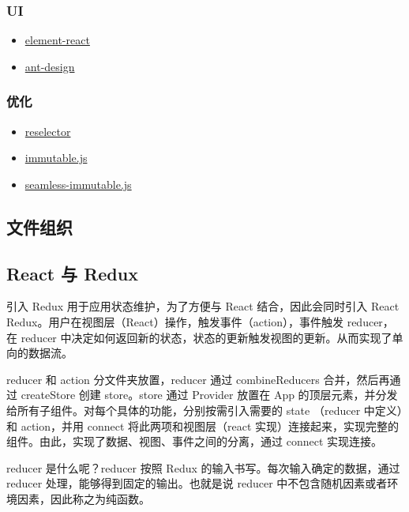 \subsubsection{UI}\label{ui}

\begin{itemize}
\tightlist
\item
  \href{https://eleme.github.io/element-react/}{element-react}
\item
  \href{https://ant.design/}{ant-design}
\end{itemize}

\subsubsection{优化}\label{ux4f18ux5316}

\begin{itemize}
\tightlist
\item
  \href{https://github.com/reactjs/reselect}{reselector}
\item
  \href{https://github.com/facebook/immutable-js}{immutable.js}
\item
  \href{https://github.com/rtfeldman/seamless-immutable}{seamless-immutable.js}
\end{itemize}

\subsection{文件组织}\label{ux6587ux4ef6ux7ec4ux7ec7}

\subsection{React 与 Redux}\label{react-ux4e0e-redux}

引入 Redux 用于应用状态维护，为了方便与 React 结合，因此会同时引入 React
Redux。用户在视图层（React）操作，触发事件（action），事件触发
reducer，在 reducer
中决定如何返回新的状态，状态的更新触发视图的更新。从而实现了单向的数据流。

reducer 和 action 分文件夹放置，reducer 通过 combineReducers
合并，然后再通过 createStore 创建 store。store 通过 Provider 放置在 App
的顶层元素，并分发给所有子组件。对每个具体的功能，分别按需引入需要的
state （reducer 中定义）和 action，并用 connect 将此两项和视图层（react
实现）连接起来，实现完整的组件。由此，实现了数据、视图、事件之间的分离，通过
connect 实现连接。

reducer 是什么呢？reducer 按照 Redux
的输入书写。每次输入确定的数据，通过 reducer
处理，能够得到固定的输出。也就是说 reducer
中不包含随机因素或者环境因素，因此称之为纯函数。

